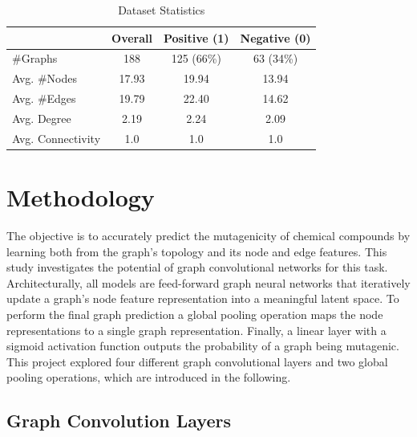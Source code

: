 \documentclass[10pt,conference,compsocconf]{ieee}
\begin{document}
\begin{table}[ht]
  \centering
  \begin{tabular}{lccc}
    \toprule
    & \textbf{Overall} & \textbf{Positive} (1)& \textbf{Negative} (0) \\
    \midrule
    \#Graphs & 188 & 125 (66\%) & 63 (34\%) \\
    Avg. \#Nodes & 17.93 & 19.94 & 13.94 \\
    Avg. \#Edges & 19.79 & 22.40 & 14.62 \\
    Avg. Degree & 2.19 & 2.24 & 2.09 \\
    Avg. Connectivity & 1.0 & 1.0 & 1.0 \\
    \bottomrule
  \end{tabular}
  \caption{Dataset Statistics}
  \label{tab:dataset}
\end{table}

\section{Methodology}

The objective is to accurately predict the mutagenicity of chemical compounds by
learning both from the graph's topology and its node and edge features. This
study investigates the potential of graph convolutional networks for this task.
Architecturally, all models are feed-forward graph neural networks that
iteratively update a graph's node feature representation into a meaningful
latent space. To perform the final graph prediction a global pooling operation
maps the node representations to a single graph representation. Finally, a
linear layer with a sigmoid activation function outputs the probability of a
graph being mutagenic. This project explored four different graph convolutional
layers and two global pooling operations, which are introduced in the following.


\subsection{Graph Convolution Layers}
\end{document}
